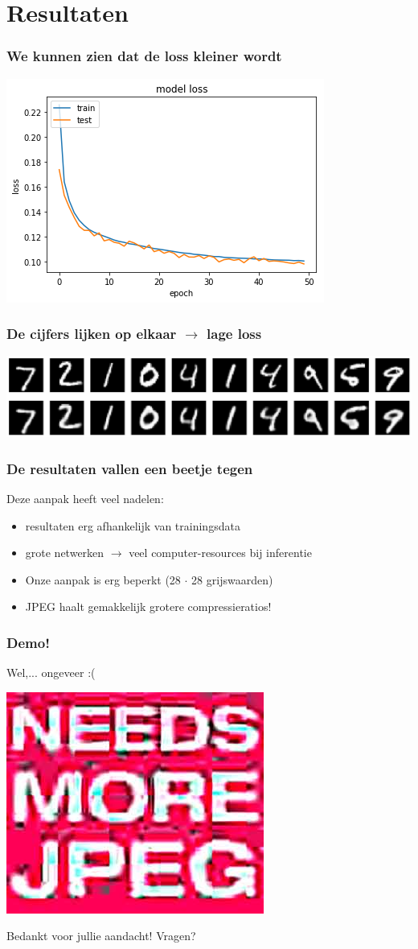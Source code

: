 \documentclass[]{beamer}
\begin{document}
\section{Resultaten}
\begin{frame}
	\frametitle{We kunnen zien dat de loss kleiner wordt}
	\centering
	\includegraphics[height = 0.8\textheight]{loss.png}
\end{frame}

\begin{frame}
	\frametitle{De cijfers lijken op elkaar $\rightarrow$ lage loss}
	\centering
	\includegraphics[width = \textwidth]{mnistreconstruction}
\end{frame}

\begin{frame}
	\frametitle{De resultaten vallen een beetje tegen}
	Deze aanpak heeft veel nadelen: \pause
	\begin{itemize}
		\item resultaten erg afhankelijk van trainingsdata \pause
		\item grote netwerken $\rightarrow$ veel computer-resources bij inferentie \pause
		\item Onze aanpak is erg beperkt (28 $\cdot$ 28 grijswaarden) \pause
		\item JPEG haalt gemakkelijk grotere compressieratios! \pause
	\end{itemize}
\end{frame}

\begin{frame}
	\frametitle{Demo!}
	\centering
	Wel,... ongeveer :(
\end{frame}

\begin{frame}
	\centering
	\includegraphics[height = 0.6\textheight]{jpeg.jpg}
	
	Bedankt voor jullie aandacht! Vragen?
\end{frame}
\end{document}

